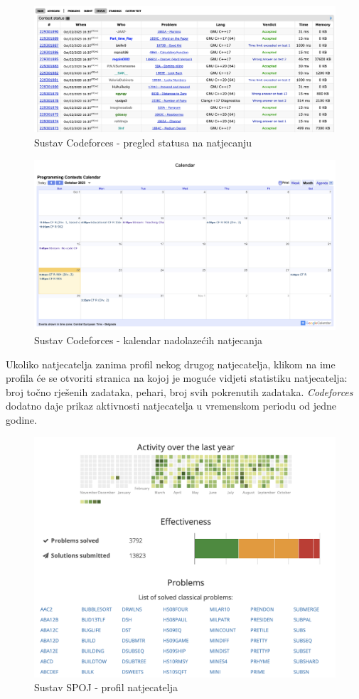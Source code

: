 		\begin{figure}[H]
			\includegraphics[scale=0.4]{slike/codeforces1.png} 
			\centering
			\caption{Sustav Codeforces - pregled statusa na natjecanju}
			\label{figure:codeforces1}
		\end{figure}
		
		\begin{figure}[H]
			\includegraphics[scale=0.4]{slike/codeforces2.png} 
			\centering
			\caption{Sustav Codeforces - kalendar nadolazećih natjecanja}
			\label{fig:codeforces2}
		\end{figure}
		
		Ukoliko natjecatelja zanima profil nekog drugog natjecatelja, klikom na ime profila će se otvoriti stranica na kojoj je moguće vidjeti statistiku natjecatelja: broj točno rješenih zadataka, pehari, broj svih pokrenutih zadataka. \emph{Codeforces} dodatno daje prikaz aktivnosti natjecatelja u vremenskom periodu od jedne godine.
		
		\begin{figure}[H]
			\includegraphics[scale=0.4]{slike/spoj2.png} 
			\centering
			\caption{Sustav SPOJ - profil natjecatelja}
			\label{fig:spoj2}
		\end{figure}		
		
	
